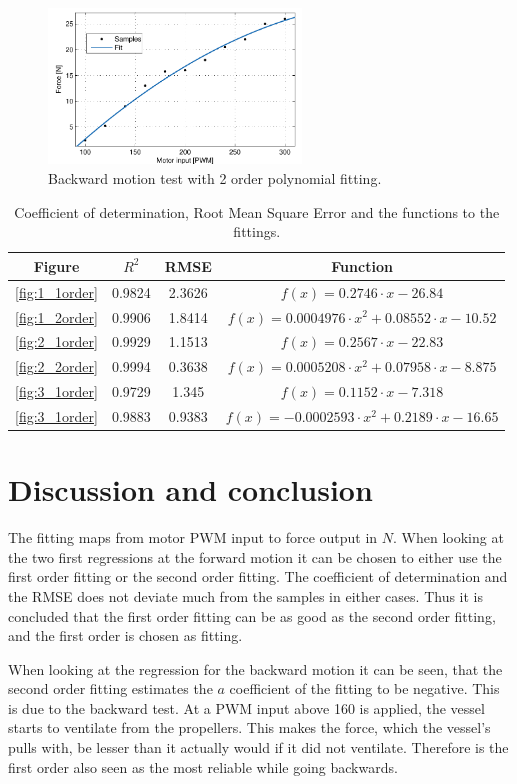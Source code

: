 \begin{figure}[htbp]
	\centering
	\includegraphics[width=0.6\textwidth]{plot/both_force_3_2order}
	\caption{Backward motion test with 2 order polynomial fitting.}
	\label{fig:3_2order}
\end{figure}

\begin{table}[htbp]
\centering
\begin{tabular}{cccc}
	\toprule
  Figure & $R^2$ & RMSE & Function\\
  \midrule
  \ref{fig:1_1order} & 0.9824 & 2.3626 & $f(x)=0.2746\cdot x-26.84$\\
  \ref{fig:1_2order} & 0.9906 & 1.8414 & $f(x)=0.0004976\cdot x^2+0.08552\cdot x-10.52$\\
  \ref{fig:2_1order} & 0.9929 & 1.1513 & $f(x)=0.2567\cdot x-22.83$\\
  \ref{fig:2_2order} & 0.9994 & 0.3638 & $f(x)=0.0005208\cdot x^2+0.07958\cdot x-8.875$\\
  \ref{fig:3_1order} & 0.9729 & 1.345 & $f(x)=0.1152\cdot x-7.318$\\
  \ref{fig:3_1order} & 0.9883 & 0.9383 & $f(x)=-0.0002593\cdot x^2+0.2189\cdot x-16.65$\\
  \bottomrule
\end{tabular}
\caption{Coefficient of determination, Root Mean Square Error and the functions to the fittings.}
\label{tab:fitting}
\end{table}

\section{Discussion and conclusion}
The fitting maps from motor \ac{PWM} input to force output in $N$. When looking at the two first regressions at the forward motion it can be chosen to either use the first order fitting or the second order fitting. The coefficient of determination and the RMSE does not deviate much from the samples in either cases. Thus it is concluded that the first order fitting can be as good as the second order fitting, and the first order is chosen as fitting.

When looking at the regression for the backward motion it can be seen, that the second order fitting estimates the $a$ coefficient of the fitting to be negative. This is due to the backward test. At a \ac{PWM} input above 160 is applied, the vessel starts to ventilate from the propellers. This makes the force, which the vessel's pulls with, be lesser than it actually would if it did not ventilate. Therefore is the first order also seen as the most reliable while going backwards.
